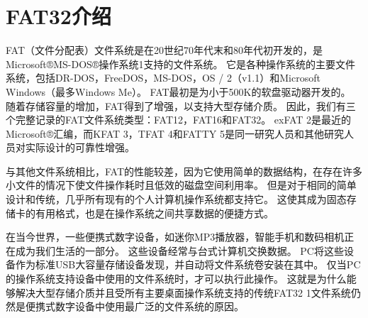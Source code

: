 \chapter{FAT32介绍}
FAT（文件分配表）文件系统是在20世纪70年代末和80年代初开发的，是Microsoft®MS-DOS®操作系统1支持的文件系统。 它是各种操作系统的主要文件系统，包括DR-DOS，FreeDOS，MS-DOS，OS / 2（v1.1）和Microsoft Windows（最多Windows Me）。 FAT最初是为小于500K的软盘驱动器开发的。 随着存储容量的增加，FAT得到了增强，以支持大型存储介质。 因此，我们有三个完整记录的FAT文件系统类型：FAT12，FAT16和FAT32。 exFAT 2是最近的Microsoft®汇编，而KFAT 3，TFAT 4和FATTY 5是同一研究人员和其他研究人员对实际设计的可靠性增强。
\par
与其他文件系统相比，FAT的性能较差，因为它使用简单的数据结构，在存在许多小文件的情况下使文件操作耗时且低效的磁盘空间利用率。 但是对于相同的简单设计和传统，几乎所有现有的个人计算机操作系统都支持它。 这使其成为固态存储卡的有用格式，也是在操作系统之间共享数据的便捷方式。
\par
在当今世界，一些便携式数字设备，如迷你MP3播放器，智能手机和数码相机正在成为我们生活的一部分。 这些设备经常与台式计算机交换数据。 PC将这些设备作为标准USB大容量存储设备发现，并自动将文件系统卷安装在其中。 仅当PC的操作系统支持设备中使用的文件系统时，才可以执行此操作。 这就是为什么能够解决大型存储介质并且受所有主要桌面操作系统支持的传统FAT32 1文件系统仍然是便携式数字设备中使用最广泛的文件系统的原因。





